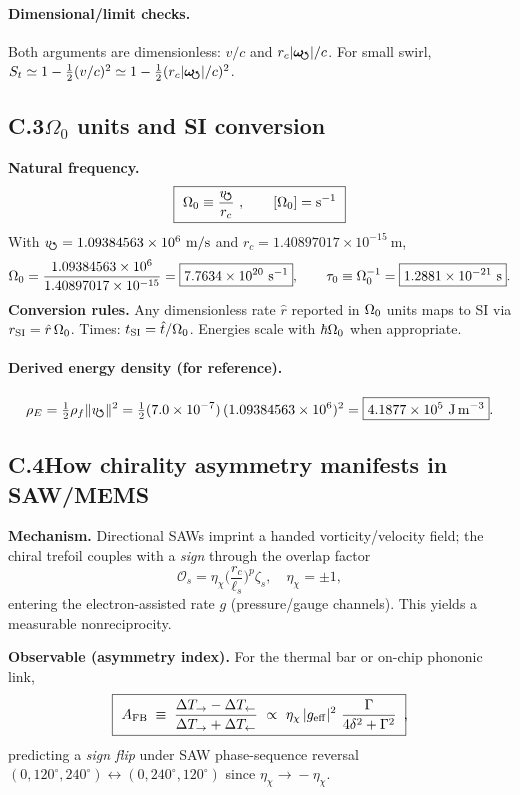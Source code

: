 \documentclass[aps,prb,preprint,amsmath,amssymb]{revtex4-2} %
\newcommand{\vswirlVal}{1.09384563\times10^{6}} %
\newcommand{\rcVal}{1.40897017\times10^{-15}} %
\newcommand{\rhoFVal}{7.0\times10^{-7}} %
\newcommand{\vswirl}{v_{\!\mkern-2mu\scriptstyle\boldsymbol{\circlearrowleft}}}
\newcommand{\rc}{r_c}
\newcommand{\rhoF}{\rho_{f}}
\newcommand{\rhoE}{\rho_{E}}
\newcommand{\omegas}{\boldsymbol{\omega}_{\!\mkern-2mu\scriptstyle\boldsymbol{\circlearrowleft}}} %
\begin{document}
    \paragraph*{Dimensional/limit checks.}
        Both arguments are dimensionless: \(v/c\) and \(\rc |\omegas|/c\). For small swirl, \(S_t\simeq 1-\tfrac{1}{2}(v/c)^2\simeq 1-\tfrac{1}{2}(\rc |\omegas|/c)^2\).

    \subsection*{C.3\quad \texorpdfstring{$\Omega_{0}$}{Omega0} units and SI conversion}
    \textbf{Natural frequency.}
    \begin{align}
        \boxed{\ \OmegaZero \equiv \frac{\vswirl}{\rc}\ ,\qquad [\OmegaZero]=\mathrm{s^{-1}} \ }
        \label{eq:Omega0}
    \end{align}
    With \(\vswirl=\vswirlVal\ \mathrm{m/s}\) and \(\rc=\rcVal\ \mathrm{m}\),
    \[
        \OmegaZero=\frac{\vswirlVal}{\rcVal}=\boxed{7.7634\times 10^{20}\ \mathrm{s^{-1}}},\qquad
        \tau_0\equiv \OmegaZero^{-1}=\boxed{1.2881\times 10^{-21}\ \mathrm{s}}.
    \]
    \textbf{Conversion rules.} Any dimensionless rate \(\hat r\) reported in \(\Omega_{0}\) units maps to SI via \(r_{\rm SI}=\hat r\,\Omega_{0}\). Times: \(t_{\rm SI}=\hat t/\Omega_{0}\). Energies scale with \(\hbar\Omega_{0}\) when appropriate.

    \paragraph*{Derived energy density (for reference).}
        \[
            \rhoE=\tfrac12\rhoF\|\vswirl\|^2=\tfrac12(\rhoFVal)\,(\vswirlVal)^2=\boxed{4.1877\times 10^{5}\ \mathrm{J\,m^{-3}}}.
        \]

    \subsection*{C.4\quad How chirality asymmetry manifests in SAW/MEMS}
    \textbf{Mechanism.} Directional SAWs imprint a handed vorticity/velocity field; the chiral trefoil couples with a \emph{sign} through the overlap factor
    \[
        \mathcal O_s=\eta_\chi\Big(\frac{\rc}{\ell_s}\Big)^{p}\zeta_s,\quad \eta_\chi=\pm 1,
    \]
    entering the electron-assisted rate \(g\) (pressure/gauge channels). This yields a measurable nonreciprocity.

    \textbf{Observable (asymmetry index).}
    For the thermal bar or on-chip phononic link,
    \begin{align}
        \boxed{\ A_{\rm FB}\;\equiv\;\frac{\Delta T_{\rightarrow}-\Delta T_{\leftarrow}}{\Delta T_{\rightarrow}+\Delta T_{\leftarrow}}
        \ \propto\ \eta_\chi\,|g_{\rm eff}|^{2}\ \frac{\Gamma}{4\delta^{2}+\Gamma^{2}}\ }\!,
        \label{eq:asymmetry}
    \end{align}
    predicting a \emph{sign flip} under SAW phase-sequence reversal \((0,120^\circ,240^\circ)\!\leftrightarrow\!(0,240^\circ,120^\circ)\) since \(\eta_\chi\!\to\!-\eta_\chi\).
\end{document}
